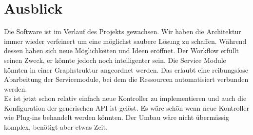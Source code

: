 \chapter{Ausblick}
Die Software ist im Verlauf des Projekts gewachsen. 
Wir haben die Architektur immer wieder verfeinert um eine möglichst 
saubere Lösung zu schaffen. Während dessen haben sich neue Möglichkeiten und Ideen eröffnet. 
Der Workflow erfüllt seinen Zweck, er könnte jedoch noch intelligenter sein. Die Service Module könnten
 in einer Graphstruktur angeordnet werden. Das erlaubt eine reibungslose Abarbeitung der Servicemodule, 
 bei dem die Ressourcen automatisiert verbunden werden.\\
Es ist jetzt schon relativ einfach neue Kontroller zu implementieren und auch die Konfiguration der generischen 
API ist gelöst. Es wäre schön wenn neue Kontroller wie Plug-ins behandelt werden könnten. 
Der Umbau wäre nicht übermässig komplex, benötigt aber etwas Zeit.\\